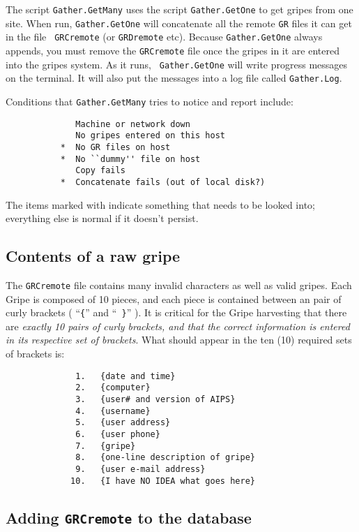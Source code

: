 The script {\tt Gather.GetMany} uses the script {\tt Gather.GetOne} to
get gripes from one site.  When run, {\tt Gather.GetOne} will
concatenate all the remote {\tt GR} files it can get in the file {\tt
GRCremote} (or {\tt GRDremote} etc).  Because {\tt Gather.GetOne}
always appends, you must remove the {\tt GRCremote} file once the
gripes in it are entered into the gripes system.  As it runs, {\tt
Gather.GetOne} will write progress messages on the terminal.  It will
also put the messages into a log file called {\tt Gather.Log}.

Conditions that {\tt Gather.GetMany} tries to notice and report include:
\begin{verbatim}
              Machine or network down
              No gripes entered on this host
           *  No GR files on host
           *  No ``dummy'' file on host
              Copy fails
           *  Concatenate fails (out of local disk?)
\end{verbatim}
The items marked with {\tt *} indicate something that needs to be
looked into; everything else is normal if it doesn't persist.

\subsection{Contents of a raw gripe}

The {\tt GRCremote} file contains many invalid characters as well as
valid gripes.  Each Gripe is composed of 10 pieces, and each piece is
contained between an pair of curly brackets ( ``{\tt \{}'' and ``{\tt
\}}'' ).  It is critical for the Gripe harvesting that there are {\it
exactly 10 pairs of curly brackets, and that the correct information
is entered in its respective set of brackets}.  What should appear in
the ten (10) required sets of brackets is:
\begin{verbatim}
              1.   {date and time}
              2.   {computer}
              3.   {user# and version of AIPS}
              4.   {username}
              5.   {user address}
              6.   {user phone}
              7.   {gripe}
              8.   {one-line description of gripe}
              9.   {user e-mail address}
             10.   {I have NO IDEA what goes here}
\end{verbatim}
\addtocounter{footnote}{1}

\subsection{Adding {\tt GRCremote} to the database}

